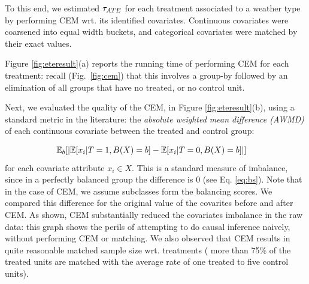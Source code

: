 To this end, we estimated ${\tau_{ATE}}$  for each treatment associated to a weather type by performing CEM wrt. its identified covariates.  Continuous covariates were coarsened into equal width buckets, and categorical covariates were
matched by their exact values.

Figure \ref{fig:eteresult}(a) reports the running time of performing
CEM for each treatment: recall (Fig.~\ref{fig:cem}) that this involves
a group-by followed by an elimination of all groups that have no
treated, or no control unit.
 Next, we evaluated the quality of the CEM, in Figure
\ref{fig:eteresult}(b), using a standard metric in the literature: the
{\em absolute weighted mean difference (AWMD)} of each continuous
covariate between the treated and control group:

\vspace{-.5cm}
{\small
\begin{align}
& \mathbb{E}_b[|\mathbb{E}[x_i | T=1, B(X)=b]-\mathbb{E}[x_i | T=0, B(X)=b]|] \label{eq:awmd}
\end{align}
}\noindent for each covariate attribute $x_i \in X$.  This is
a standard measure of imbalance, since in a perfectly balanced group
the difference is 0 (see Eq. \ref{eq:bs}). Note that in the case of CEM, we assume subclasses form the balancing scores.  We compared this
difference for the original value of the covarites  before and after CEM.  As shown, CEM substantially reduced
the covariates imbalance in the raw data: this graph shows the perils
of attempting to do causal inference naively, without performing CEM
or matching.  We also observed that CEM results in quite reasonable
matched sample size wrt. treatments ( more than 75\% of the treated
units are matched with the average rate of one treated to five control
units).





 


